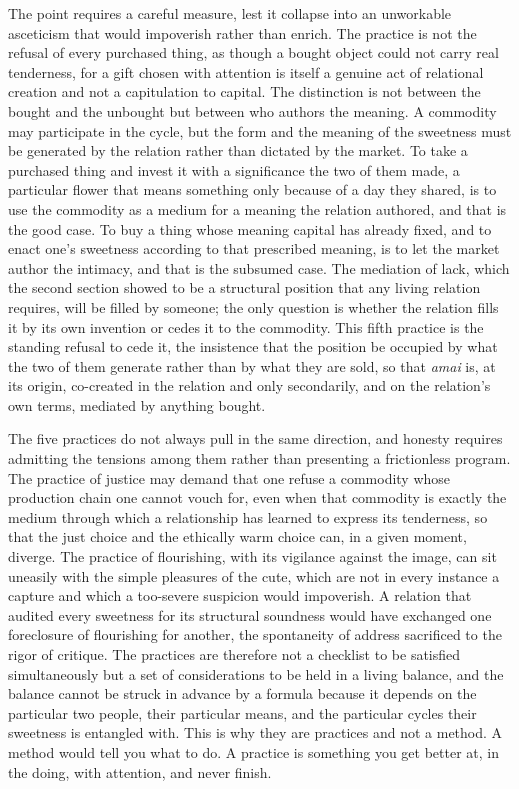 \documentclass[11pt,a4paper]{article}
\begin{document}
The point requires a careful measure, lest it collapse into an unworkable asceticism that would impoverish rather than enrich. The practice is not the refusal of every purchased thing, as though a bought object could not carry real tenderness, for a gift chosen with attention is itself a genuine act of relational creation and not a capitulation to capital. The distinction is not between the bought and the unbought but between who authors the meaning. A commodity may participate in the cycle, but the form and the meaning of the sweetness must be generated by the relation rather than dictated by the market. To take a purchased thing and invest it with a significance the two of them made, a particular flower that means something only because of a day they shared, is to use the commodity as a medium for a meaning the relation authored, and that is the good case. To buy a thing whose meaning capital has already fixed, and to enact one's sweetness according to that prescribed meaning, is to let the market author the intimacy, and that is the subsumed case. The mediation of lack, which the second section showed to be a structural position that any living relation requires, will be filled by someone; the only question is whether the relation fills it by its own invention or cedes it to the commodity. This fifth practice is the standing refusal to cede it, the insistence that the position be occupied by what the two of them generate rather than by what they are sold, so that \textit{amai} is, at its origin, co-created in the relation and only secondarily, and on the relation's own terms, mediated by anything bought.

The five practices do not always pull in the same direction, and honesty requires admitting the tensions among them rather than presenting a frictionless program. The practice of justice may demand that one refuse a commodity whose production chain one cannot vouch for, even when that commodity is exactly the medium through which a relationship has learned to express its tenderness, so that the just choice and the ethically warm choice can, in a given moment, diverge. The practice of flourishing, with its vigilance against the image, can sit uneasily with the simple pleasures of the cute, which are not in every instance a capture and which a too-severe suspicion would impoverish. A relation that audited every sweetness for its structural soundness would have exchanged one foreclosure of flourishing for another, the spontaneity of address sacrificed to the rigor of critique. The practices are therefore not a checklist to be satisfied simultaneously but a set of considerations to be held in a living balance, and the balance cannot be struck in advance by a formula because it depends on the particular two people, their particular means, and the particular cycles their sweetness is entangled with. This is why they are practices and not a method. A method would tell you what to do. A practice is something you get better at, in the doing, with attention, and never finish.
\end{document}
